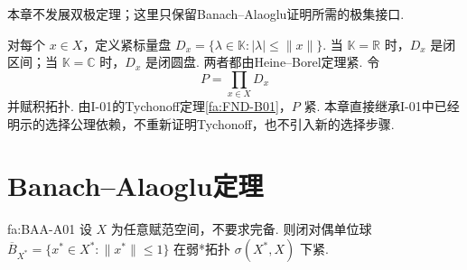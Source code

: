 本章不发展双极定理；这里只保留Banach--Alaoglu证明所需的极集接口.

对每个 \(\displaystyle x\in X\)，定义紧标量盘
\(\displaystyle D_x=\{\lambda\in\mathbb K:|\lambda|\leqslant\|x\|\}\).
当 \(\displaystyle \mathbb K=\mathbb R\) 时，\(\displaystyle D_x\) 是闭区间；当 \(\displaystyle \mathbb K=\mathbb C\) 时，\(\displaystyle D_x\) 是闭圆盘. 两者都由Heine--Borel定理紧. 令
\[
P=\prod_{x\in X}D_x
\]
并赋积拓扑. 由I-01的Tychonoff定理\autoref{fa:FND-B01}，\(\displaystyle P\) 紧. 本章直接继承I-01中已经明示的选择公理依赖，不重新证明Tychonoff，也不引入新的选择步骤.

\section{Banach--Alaoglu定理}\label{sec:i10-banach-alaoglu}

\begin{FATheorem}{fa:BAA-A01}
设 \(\displaystyle X\) 为任意赋范空间，不要求完备. 则闭对偶单位球
\(\displaystyle \overline B_{X^*}=\{x^*\in X^*:\|x^*\|\leqslant1\}\)
在弱*拓扑 \(\displaystyle \sigma(X^*,X)\) 下紧.
\end{FATheorem}

